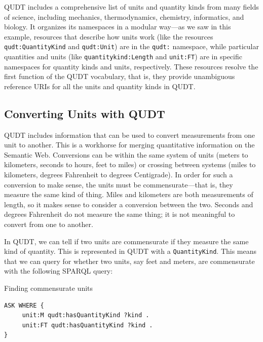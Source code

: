 QUDT includes a comprehensive list of units and quantity kinds from many
fields of science, including mechanics, thermodynamics, chemistry,
informatics, and biology. It organizes its namespaces in a modular
way---as we saw in this example, resources that describe how units work
(like the resources \texttt{qudt:QuantityKind} and \texttt{qudt:Unit}) are in the \texttt{qudt:}
namespace, while particular quantities and units (like
\texttt{quantitykind:Length} and \texttt{unit:FT}) are in specific namespaces
for quantity kinds and units, respectively. 
These resources resolve the first function of the QUDT vocabulary, that
is, they provide unambiguous reference URIs for all the units and
quantity kinds in QUDT.

\subsection{Converting Units with QUDT}

QUDT includes information that can be used to convert measurements from
one unit to another. This is a workhorse for merging quantitative
information on the Semantic Web. Conversions can be within the same
system of units (meters to kilometers, seconds to hours, feet to miles)
or crossing between systems (miles to kilometers, degrees Fahrenheit to
degrees Centigrade). In order for such a conversion to make sense, the
units must be commensurate---that is, they measure the same kind of
thing. Miles and kilometers are both measurements of length, so it makes
sense to consider a conversion between the two. Seconds and degrees
Fahrenheit do not measure the same thing; it is not meaningful to
convert from one to another.

In QUDT, we can tell if two units are commensurate if they measure the same
kind of quantity.  This is represented in QUDT with a \texttt{QuantityKind}.  
This means that we can query for whether two units, say feet and meters,  are commensurate with
the following SPARQL
query:

\begin{query}Finding commensurate units \end{query}
\begin{lstlisting}
ASK WHERE {
     unit:M qudt:hasQuantityKind ?kind .
     unit:FT qudt:hasQuantityKind ?kind .
}
\end{lstlisting}



